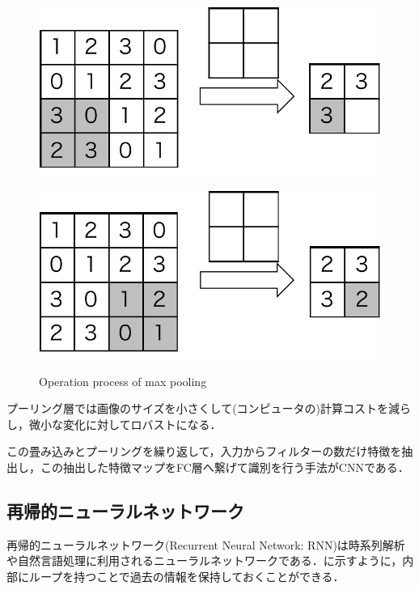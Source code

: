 \begin{figure}[H]
\begin{minipage}[b]{0.4\columnwidth}
		\label{fig:pooling_ex2}
	\end{minipage}
	\begin{minipage}[b]{0.4\columnwidth}
		\centering
		\includegraphics[width=\linewidth]{fig/pooling_ex3}
		\subcaption{}
		\label{fig:pooling_ex3}
	\end{minipage}
	\hspace{10truemm}
	\begin{minipage}[b]{0.4\columnwidth}
		\centering
		\includegraphics[width=\linewidth]{fig/pooling_ex4}
		\subcaption{}
		\label{fig:pooling_ex4}
	\end{minipage}
	\caption{Operation process of max pooling}
	\label{fig:maxpooling}
\end{figure}

プーリング層では画像のサイズを小さくして(コンピュータの)計算コストを減らし，微小な変化に対してロバストになる．

この畳み込みとプーリングを繰り返して，入力からフィルターの数だけ特徴を抽出し，この抽出した特徴マップをFC層へ繋げて識別を行う手法がCNNである．


\subsection{再帰的ニューラルネットワーク}
再帰的ニューラルネットワーク(Recurrent Neural Network: RNN)は時系列解析や自然言語処理に利用されるニューラルネットワークである．に示すように，内部にループを持つことで過去の情報を保持しておくことができる．

